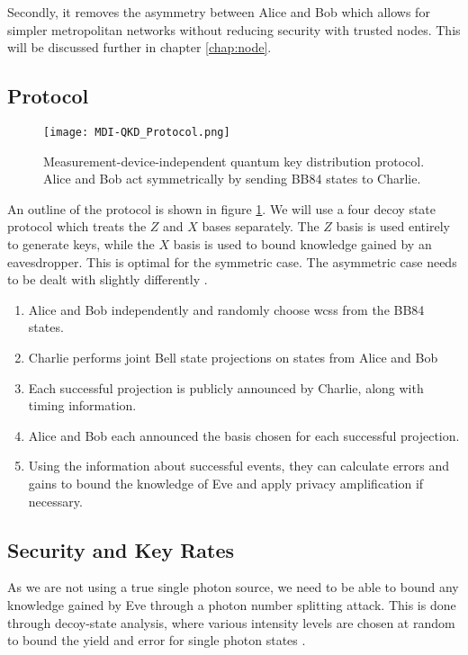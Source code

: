Secondly, it removes the asymmetry between Alice and Bob which allows for simpler metropolitan networks without reducing security with trusted nodes. This will be discussed further in chapter \ref{chap:node}.

\subsection{Protocol}

\begin{figure}[tbp]
	\centering
	\texttt{[image: MDI-QKD\_Protocol.png]}
	\caption[MDI-QKD protocol]{Measurement-device-independent quantum key distribution protocol. Alice and Bob act symmetrically by sending BB84 states to Charlie.}
	\label{fig:mdi_protocol}
\end{figure}

An outline of the protocol is shown in figure \ref{fig:mdi_protocol}. We will use a four decoy state protocol \cite{zhou2016} which treats the $Z$ and $X$ bases separately. The $Z$ basis is used entirely to generate keys, while the $X$ basis is used to bound knowledge gained by an eavesdropper. This is optimal for the symmetric case. The asymmetric case needs to be dealt with slightly differently \cite{wang2018}.

\begin{enumerate}
	\item {} Alice and Bob independently and randomly choose \acp{wcs} from the BB84 states. 
	\item {} Charlie performs joint Bell state projections on states from Alice and Bob
	\item {} Each successful projection is publicly announced by Charlie, along with timing information.
	\item {} Alice and Bob each announced the basis chosen for each successful projection.
	\item {} Using the information about successful events, they can calculate errors and gains to bound the knowledge of Eve and apply privacy amplification if necessary.
\end{enumerate}

\subsection{Security and Key Rates}

As we are not using a true single photon source, we need to be able to bound any knowledge gained by Eve through a photon number splitting attack. This is done through decoy-state analysis, where various intensity levels are chosen at random to bound the yield and error for single photon states \cite{Lo2005}. 

